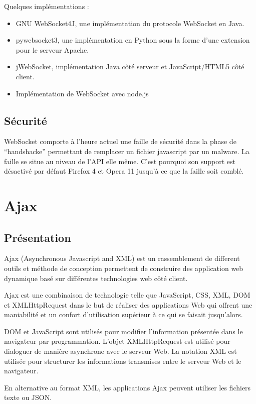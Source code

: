 \documentclass[a4paper,10pt]{report}
\begin{document}
Quelques implémentations :
\begin{itemize}
  \item GNU WebSocket4J, une implémentation du protocole WebSocket en Java. 
  \item pywebsocket3, une implémentation en Python sous la forme d'une extension pour le serveur  Apache.
  \item jWebSocket, implémentation Java côté serveur et JavaScript/HTML5 côté client.
  \item Implémentation de WebSocket avec node.js
\end{itemize}


    \subsection{Sécurité}

WebSocket comporte à l'heure actuel une faille de sécurité dans la phase 
de ``handshacke'' permettant de remplacer un fichier javascript par un malware. 
La faille se situe au niveau de l'API elle même. C'est pourquoi son support 
est désactivé par défaut Firefox 4 et Opera 11 jusqu'à ce que la faille 
soit comblé.


  \section{Ajax}

    \subsection{Présentation}

Ajax (Asynchronous Javascript and XML) est un rassemblement de different outils 
et méthode de conception permettent de construire des application web dynamique 
basé sur différentes technologies web côté client.

Ajax est une combinaison de technologie telle que JavaScript, CSS, XML, DOM et 
XMLHttpRequest dans le but de réaliser des applications Web qui offrent une 
maniabilité et un confort d'utilisation supérieur à ce qui se faisait jusqu'alors.

DOM et JavaScript sont utilisés pour modifier l'information présentée dans le navigateur 
par programmation. L'objet XMLHttpRequest est utilisé pour dialoguer de manière 
asynchrone avec le serveur Web. La notation XML est utilisée pour structurer les 
informations transmises entre le serveur Web et le navigateur.

En alternative au format XML, les applications Ajax peuvent utiliser les fichiers texte ou JSON.
\end{document}
